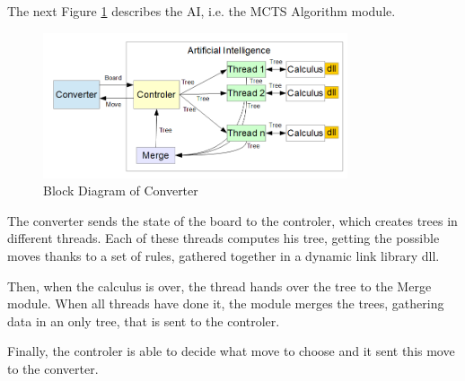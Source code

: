 The next Figure \ref{fig:flow} describes the AI, i.e. the MCTS Algorithm module.

\begin{figure}[H]
	\centering
	\includegraphics[width=0.80\textwidth]{2General_Architecture/2.3MCTS/AI.png}
	\caption{Block Diagram of Converter}
	\label{fig:flow}
\end{figure}

The converter sends the state of the board to the controler, which creates trees in different threads. Each of these threads computes his tree, getting the possible moves thanks to a set of rules, gathered together in a dynamic link library dll. 

Then, when the calculus is over, the thread hands over the tree to the Merge module. When all threads have done it, the module merges the trees, gathering data in an only tree, that is sent to the controler.

Finally, the controler is able to decide what move to choose and it sent this move to the converter.

